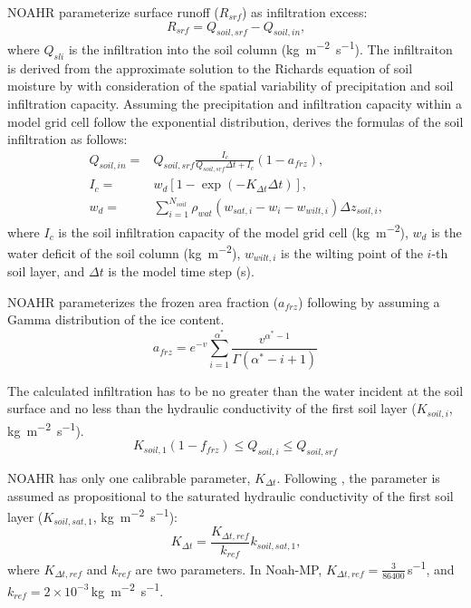 \documentclass[essd]{copernicus}
\begin{document}
NOAHR parameterize surface runoff (\(R_{srf}\)) as infiltration excess:
\begin{equation}
  R_{srf} = Q_{soil,srf} - Q_{soil,in} \text{,}
\end{equation}
where \(Q_{sli}\) is the infiltration into the soil column
(\si{kg~m^{-2}~s^{-1}}). The infiltraiton is derived from the approximate
solution to the Richards equation of soil moisture by \citet{philip1969AiH} with
consideration of the spatial variability of precipitation and soil infiltration
capacity. Assuming the precipitation and infiltration capacity within a model
grid cell follow the exponential distribution, \citet{schaake1996JGRA} derives
the formulas of the soil infiltration as follows:
\begin{align}
  Q_{soil,in} = & Q_{soil,srf} \frac{I_c}{Q_{soil,srf} \Delta t + I_c} (1-a_{frz}) \text{,} \\
  I_{c} =       & w_d [1-\exp(-K_{\Delta t} \Delta t)] \text{,} \\
  w_d =         & \sum_{i=1}^{N_{soil}} \rho_{wat} (w_{sat,i} - w_i - w_{wilt,i}) \Delta z_{soil,i}
  \text{,}
\end{align}
where \(I_{c}\) is the soil infiltration capacity of the model grid cell
(\si{kg~m^{-2}}), \(w_d\) is the water deficit of the soil column
(\si{kg~m^{-2}}), \(w_{wilt,i}\) is the wilting point of the \(i\)-th soil
layer, and \(\Delta t\) is the model time step (\si{s}).

NOAHR parameterizes the frozen area fraction (\(a_{frz}\)) following
\citet{koren1999JGRA} by assuming a Gamma distribution of the ice content.
\begin{equation}
  a_{frz} = e^{-v} \sum_{i=1}^{\alpha^*} \frac{v^{\alpha^*-1}}{\Gamma(\alpha^*-i+1)}
\end{equation}

The calculated infiltration has to be no greater than the water
incident at the soil surface and no less than the hydraulic conductivity of the
first soil layer (\(K_{soil,i}\), \si{kg~m^{-2}~s^{-1}}).
\begin{equation}
  K_{soil,1} (1-f_{frz}) \leq Q_{soil,i} \leq Q_{soil,srf}
\end{equation}

NOAHR has only one calibrable parameter, \(K_{\Delta t}\). Following
\citet{chen2001MWR}, the parameter is assumed as propositional to the saturated
hydraulic conductivity of the first soil layer (\(K_{soil,sat,1}\),
\si{kg~m^{-2}~s^{-1}}):
\begin{equation}
  K_{\Delta t} = \frac{{K}_{\Delta t, ref}}{k_{ref}} k_{soil,sat,1} \text{,}
\end{equation}
where \(K_{\Delta t,ref}\) and \(k_{ref}\) are two parameters. In Noah-MP,
\(K_{\Delta t,ref} = \frac{3}{86400}\)\,\si{s^{-1}}, and \(k_{ref}=2 \times
10^{-3}\)\,\si{kg~m^{-2}~s^{-1}}.
\end{document}
